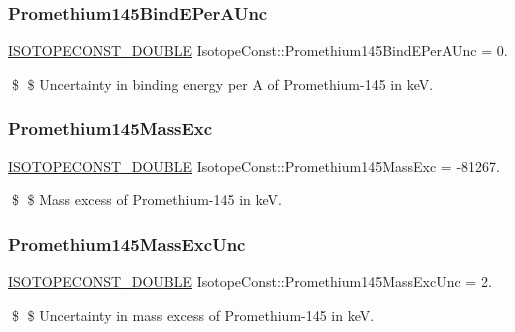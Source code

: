 \subsubsection{\texorpdfstring{Promethium145\+Bind\+E\+Per\+A\+Unc}{Promethium145BindEPerAUnc}}
{\footnotesize\ttfamily \mbox{\hyperlink{group___isotope_const-_macros_ga8f45a7272ce02c0b4c65c44636ed719a}{I\+S\+O\+T\+O\+P\+E\+C\+O\+N\+S\+T\+\_\+\+D\+O\+U\+B\+LE}} Isotope\+Const\+::\+Promethium145\+Bind\+E\+Per\+A\+Unc = 0.}

\$ \$ Uncertainty in binding energy per A of Promethium-\/145 in keV. \mbox{\label{group___isotope_const-_promethium-_pm145_ga827dedf455170c89a35afbd924ec6eee}} 
\subsubsection{\texorpdfstring{Promethium145\+Mass\+Exc}{Promethium145MassExc}}
{\footnotesize\ttfamily \mbox{\hyperlink{group___isotope_const-_macros_ga8f45a7272ce02c0b4c65c44636ed719a}{I\+S\+O\+T\+O\+P\+E\+C\+O\+N\+S\+T\+\_\+\+D\+O\+U\+B\+LE}} Isotope\+Const\+::\+Promethium145\+Mass\+Exc = -\/81267.}

\$ \$ Mass excess of Promethium-\/145 in keV. \mbox{\label{group___isotope_const-_promethium-_pm145_ga201cca0e77cc9b01ff04882e71ce76b4}} 
\subsubsection{\texorpdfstring{Promethium145\+Mass\+Exc\+Unc}{Promethium145MassExcUnc}}
{\footnotesize\ttfamily \mbox{\hyperlink{group___isotope_const-_macros_ga8f45a7272ce02c0b4c65c44636ed719a}{I\+S\+O\+T\+O\+P\+E\+C\+O\+N\+S\+T\+\_\+\+D\+O\+U\+B\+LE}} Isotope\+Const\+::\+Promethium145\+Mass\+Exc\+Unc = 2.}

\$ \$ Uncertainty in mass excess of Promethium-\/145 in keV. \mbox{\label{group___isotope_const-_promethium-_pm145_ga9b6aaa5389d61708e6cccdf51c4ce839}} 
